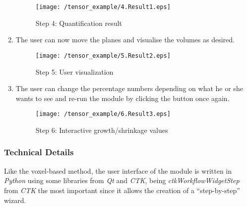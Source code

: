 \begin{enumerate}
  \begin{figure}[H]
    \centering
    \texttt{[image: /tensor\_example/4.Result1.eps]}
    \caption{Step 4: Quantification result}
    \label{tensor_ex_4}
  \end{figure}
  
\item The user can now move the planes and visualise the volumes as desired.
  
  \begin{figure}[H]
    \centering
    \texttt{[image: /tensor\_example/5.Result2.eps]}
    \caption{Step 5: User visualization}
    \label{tensor_ex_5}
  \end{figure}


\item The user can change the percentage numbers depending on what he
  or she wants to see and re-run the module by clicking the button
  once again.
  
  \begin{figure}[H]
    \centering
    \texttt{[image: /tensor\_example/6.Result3.eps]}
    \caption{Step 6: Interactive growth/shrinkage values}
    \label{tensor_ex_6}
  \end{figure}

\end{enumerate}


\subsubsection{Technical Details}
Like the voxel-based method, the user interface of the module is
written in \textit{Python} using some libraries from \textit{Qt} and
\textit{CTK}, being \textit{ctkWorkflowWidgetStep} from \textit{CTK}
the most important since it allows the creation of a ``step-by-step''
wizard.\\

